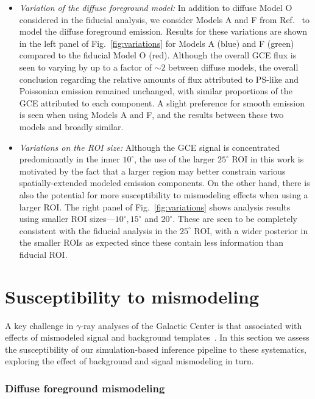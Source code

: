 \documentclass[prd,aps,10pt,nofootinbib,twocolumn,superscriptaddress,preprintnumbers,balancelastpage,longbibliography]{revtex4-1}
\begin{document}
\begin{itemize}
    \item \emph{Variation of the diffuse foreground model:} In addition to diffuse Model O considered in the fiducial analysis, we consider Models A and F from Ref.~\cite{Calore:2014xka} to model the diffuse foreground emission. Results for these variations are shown in the left panel of Fig.~\ref{fig:variations} for Models A (blue) and F (green) compared to the fiducial Model O (red). Although the overall GCE flux is seen to varying by up to a factor of $\sim2$ between diffuse models, the overall conclusion regarding the relative amounts of flux attributed to PS-like and Poissonian emission remained unchanged, with similar proportions of the GCE attributed to each component. A slight preference for smooth emission is seen when using Models A and F, and the results between these two models and broadly similar. 
    \item \emph{Variations on the ROI size:} Although the GCE signal is concentrated predominantly in the inner $10^\circ$, the use of the larger $25^\circ$ ROI in this work is motivated by the fact that a larger region may better constrain various spatially-extended modeled emission components. On the other hand, there is also the potential for more susceptibility to mismodeling effects when using a larger ROI. The right panel of Fig.~\ref{fig:variations} shows analysis results using smaller ROI sizes---$10^\circ, 15^\circ$ and $20^\circ$. These are seen to be completely consistent with the fiducial analysis in the $25^\circ$ ROI, with a wider posterior in the smaller ROIs as expected since these contain less information than fiducial ROI.
\end{itemize}

\section{Susceptibility to mismodeling}
\label{sec:mismodeling}

A key challenge in $\gamma$-ray analyses of the Galactic Center is that associated with effects of mismodeled signal and background templates~\cite{Lee:2015fea,Leane:2020pfc,Leane:2020nmi,Buschmann:2020adf,Chang:2019ars}. In this section we assess the susceptibility of our simulation-based inference pipeline to these systematics, exploring the effect of background and signal mismodeling in turn. 

\subsubsection*{Diffuse foreground mismodeling}
\end{document}
